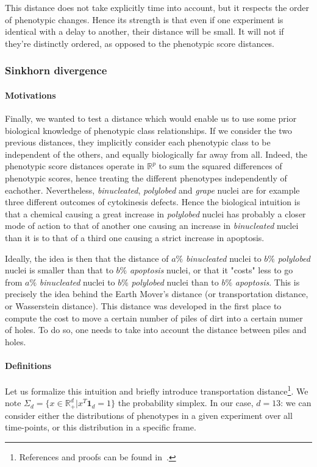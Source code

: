This distance does not take explicitly time into account, but it respects the order of phenotypic changes. Hence its strength is that even if one experiment is identical with a delay to another, their distance will be small. It will not if they're distinctly ordered, as opposed to the phenotypic score distances.

\subsubsection{Sinkhorn divergence}
\paragraph{Motivations}
Finally, we wanted to test a distance which would enable us to use some prior biological knowledge of phenotypic class relationships. If we consider the two previous distances, they implicitly consider each phenotypic class to be independent of the others, and equally biologically far away from all. Indeed, the phenotypic score distances operate in $\mathbb{R}^p$ to sum the squared differences of phenotypic scores, hence treating the different phenotypes independently of eachother. Nevertheless, \textit{binucleated}, \textit{polylobed} and \textit{grape} nuclei are for example three different outcomes of cytokinesis defects. Hence the biological intuition is that a chemical causing a great increase in \textit{polylobed} nuclei has probably a closer mode of action to that of another one causing an increase in \textit{binucleated} nuclei than it is to that of a third one causing a strict increase in apoptosis.

Ideally, the idea is then that the distance of $a\%$ \textit{binucleated} nuclei to $b\%$ \textit{polylobed} nuclei is smaller than that to $b\%$ \textit{apoptosis} nuclei, or that it "costs" less to go from $a\%$ \textit{binucleated} nuclei to $b\%$ \textit{polylobed} nuclei than to $b\%$ \textit{apoptosis}. This is precisely the idea behind the Earth Mover's distance (or transportation distance, or Wasserstein distance). This distance was developed in the first place to compute the cost to move a certain number of piles of dirt into a certain numer of holes. To do so, one needs to take into account the distance between piles and holes.
\paragraph{Definitions}
Let us formalize this intuition and briefly introduce transportation distance\footnote{References and proofs can be found in~\cite{sinkhorn}.}. We note $\Sigma_d = \{ x \in \mathbb{R}^d_+ | x^T \mathbf{1}_d = 1\}$ the probability simplex. In our case, $d=13$: we can consider either the distributions of phenotypes in a given experiment over all time-points, or this distribution in a specific frame.

